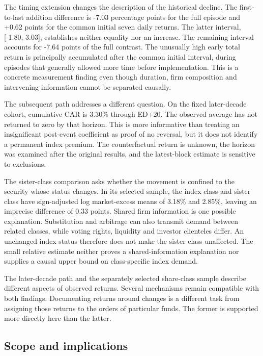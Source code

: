 The timing extension changes the description of the historical decline. The first-to-last addition difference is -7.03 percentage points for the full episode and +0.62 points for the common initial seven daily returns. The latter interval, [-1.80, 3.03], establishes neither equality nor an increase. The remaining interval accounts for -7.64 points of the full contrast. The unusually high early total return is principally accumulated after the common initial interval, during episodes that generally allowed more time before implementation. This is a concrete measurement finding even though duration, firm composition and intervening information cannot be separated causally.

The subsequent path addresses a different question. On the fixed later-decade cohort, cumulative CAR is 3.30\% through ED+20. The observed average has not returned to zero by that horizon. This is more informative than treating an insignificant post-event coefficient as proof of no reversal, but it does not identify a permanent index premium. The counterfactual return is unknown, the horizon was examined after the original results, and the latest-block estimate is sensitive to exclusions.

The sister-class comparison asks whether the movement is confined to the security whose status changes. In its selected sample, the index class and sister class have sign-adjusted log market-excess means of 3.18\% and 2.85\%, leaving an imprecise difference of 0.33 points. Shared firm information is one possible explanation. Substitution and arbitrage can also transmit demand between related classes, while voting rights, liquidity and investor clienteles differ. An unchanged index status therefore does not make the sister class unaffected. The small relative estimate neither proves a shared-information explanation nor supplies a causal upper bound on class-specific index demand.

The later-decade path and the separately selected share-class sample describe different aspects of observed returns. Several mechanisms remain compatible with both findings. Documenting returns around changes is a different task from assigning those returns to the orders of particular funds. The former is supported more directly here than the latter.

\subsection{Scope and implications}

